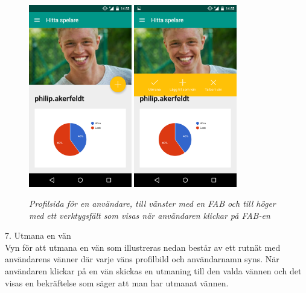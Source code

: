 \documentclass[a4paper, 11pt]{article}
\begin{document}
\begin{figure}[H]
	\begin{center}
	\includegraphics[width=0.4\textwidth]{app_profile_fab} 
	\includegraphics[width=0.4\textwidth]{app_profile_toolbar} 
	\end{center}
	\caption{\textit{Profilsida för en användare, till vänster med en FAB och till höger med ett verktygsfält som visas när användaren klickar på FAB-en }}
\end{figure}

\pagebreak
\large \textup{7. Utmana en vän}\\
Vyn för att utmana en vän som illustreras nedan består av ett rutnät med användarens vänner där varje väns profilbild och användarnamn syns. När användaren klickar på en vän skickas en utmaning till den valda vännen och det visas en bekräftelse som säger att man har utmanat vännen. 
\end{document}
